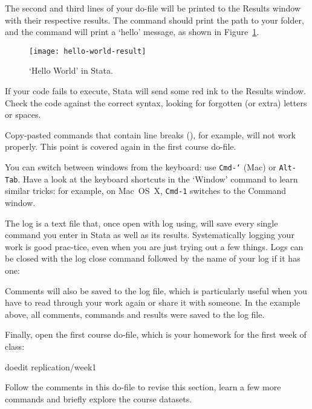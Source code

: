 \begin{description}
The second and third lines of your do-file will be printed to the Results window with their respective results. The  command should print the path to your \SRQM folder, and the  command will print a `hello' message, as shown in Figure~\ref{fig:hello-world-result}.
  
\begin{figure}%
\texttt{[image: hello-world-result]}
\caption{`Hello World' in Stata.}
\label{fig:hello-world-result}
\end{figure}

 If your code fails to execute, Stata will send some red ink to the Results window. Check the code against the correct syntax, looking for forgotten (or extra) letters or spaces.
  
 Copy-pasted commands that contain line breaks (\cmd{///}), for example, will not work properly. This point is covered again in the first course do-file.

  
You can switch between windows from the keyboard: use \texttt{Cmd-`} (Mac) or \texttt{Alt-Tab}. Have a look at the keyboard shortcuts in the `Window' command to learn similar tricks: for example, on Mac~OS~X, \texttt{Cmd-1} switches to the Command window.
  

The log is a text file that, once open with log using, will save every single command you enter in Stata as well as its results. Systematically logging your work is good prac-tice, even when you are just trying out a few things. Logs can be closed with the log close command followed by the name of your log if it has one:


Comments will also be saved to the log file, which is particularly useful when you have to read through your work again or share it with someone. In the example above, all comments, commands and results were saved to the log file.

Finally, open the first course do-file, which is your homework for the first week of class:

\begin{docspec}
doedit replication/week1
\end{docspec}

Follow the comments in this do-file to revise this section, learn a few more commands and briefly explore the course datasets.


\end{description}
